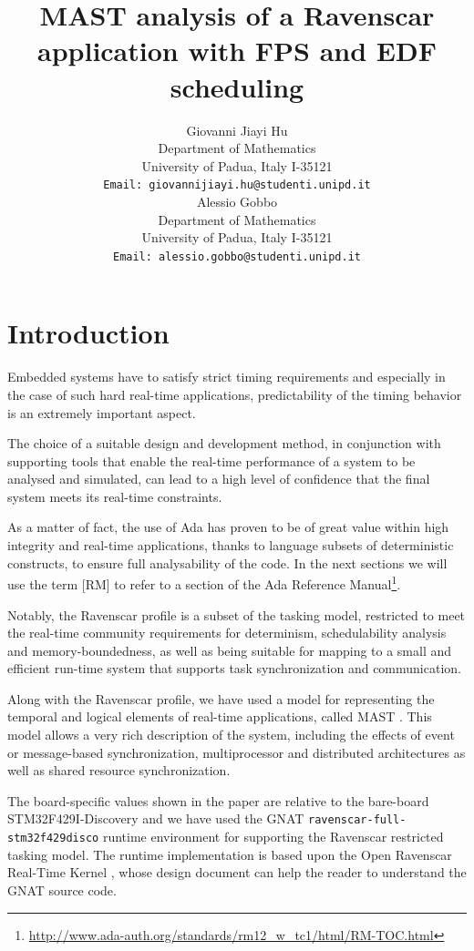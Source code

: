\documentclass{article}
\title{MAST analysis of a Ravenscar application with FPS and EDF scheduling}
\author{
  Giovanni Jiayi Hu\\
  Department of Mathematics\\
  University of Padua, Italy I-35121\\
  \texttt{Email: giovannijiayi.hu@studenti.unipd.it} \\
   \And
   Alessio Gobbo \\
   Department of Mathematics\\
   University of Padua, Italy I-35121\\
   \texttt{Email: alessio.gobbo@studenti.unipd.it} \\
}
\begin{document}
\maketitle

\begin{abstract}
\lipsum[1]
\end{abstract}



\section{Introduction}

Embedded systems have to satisfy strict timing requirements and especially in the case of such hard real-time applications, predictability of the timing behavior is an extremely important aspect.

The choice of a suitable design and development method, in conjunction with supporting tools that enable the real-time performance of a system to be analysed and simulated, can lead to a high level of confidence that the final system meets its real-time constraints.

As a matter of fact, the use of Ada has proven to be of great value within high integrity and real-time applications, thanks to language subsets of deterministic constructs, to ensure full analysability of the code. In the next sections we will use the term [RM] to refer to a section of the Ada Reference Manual\footnote{\url{http://www.ada-auth.org/standards/rm12_w_tc1/html/RM-TOC.html}}.

Notably, the Ravenscar profile \cite{ycs} is a subset of the tasking model, restricted to meet the real-time community requirements for determinism, schedulability analysis and memory-boundedness, as well as being suitable for mapping to a small and efficient run-time system that supports task synchronization and communication.

Along with the Ravenscar profile, we have used a model for representing the temporal and logical elements of real-time applications, called MAST \cite{mast}. This model allows a very rich description of the system, including the effects of event or message-based synchronization, multiprocessor and distributed architectures as well as shared resource synchronization.

The board-specific values shown in the paper are relative to the bare-board STM32F429I-Discovery and we have used the GNAT \texttt{ravenscar-full-stm32f429disco} runtime environment for supporting the Ravenscar restricted tasking model. The runtime implementation is based upon the Open Ravenscar Real-Time Kernel \cite{ork}, whose design document can help the reader to understand the GNAT source code.
\end{document}

